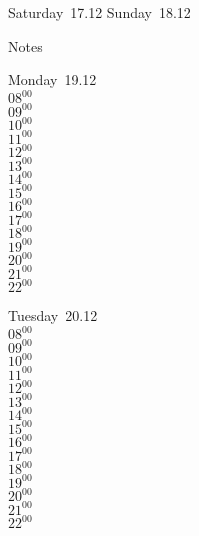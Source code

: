 \documentclass[11pt,a4paper]{book}\usepackage[]{graphicx}\usepackage[]{color}
\begin{document}
\begin{weekendbox}
  Saturday~17.12
  \tcblower
  Sunday~18.12
\end{weekendbox} %
\begin{notebox}
  Notes
\end{notebox}
\clearpage
\begin{headerbox}
\end{headerbox}
\begin{weekdaybox}
  Monday~19.12\\
  { 
  \vfill
  $08^{00}$\\
$09^{00}$\\
$10^{00}$\\
$11^{00}$\\
$12^{00}$\\
$13^{00}$\\
$14^{00}$\\
$15^{00}$\\
$16^{00}$\\
$17^{00}$\\
$18^{00}$\\
$19^{00}$\\
$20^{00}$\\
$21^{00}$\\
$22^{00}$\\
  }
\end{weekdaybox}
\begin{weekdaybox}
  Tuesday~20.12\\
  { 
  \vfill
  $08^{00}$\\
$09^{00}$\\
$10^{00}$\\
$11^{00}$\\
$12^{00}$\\
$13^{00}$\\
$14^{00}$\\
$15^{00}$\\
$16^{00}$\\
$17^{00}$\\
$18^{00}$\\
$19^{00}$\\
$20^{00}$\\
$21^{00}$\\
$22^{00}$\\
  }
\end{weekdaybox}
\end{document}
